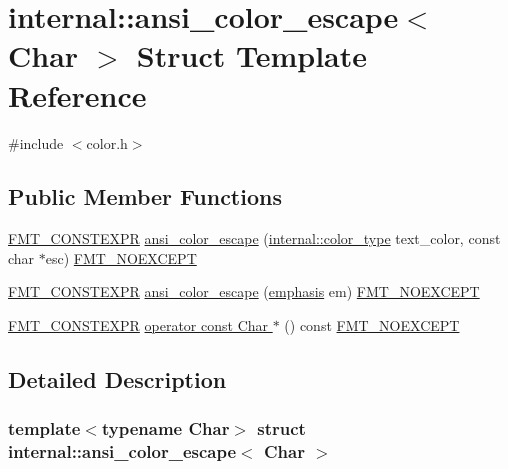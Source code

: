 \hypertarget{structinternal_1_1ansi__color__escape}{}\section{internal\+:\+:ansi\+\_\+color\+\_\+escape$<$ Char $>$ Struct Template Reference}
\label{structinternal_1_1ansi__color__escape}


{\ttfamily \#include $<$color.\+h$>$}

\subsection*{Public Member Functions}
\begin{DoxyCompactItemize}
\item 
\hyperlink{core_8h_a69201cb276383873487bf68b4ef8b4cd}{F\+M\+T\+\_\+\+C\+O\+N\+S\+T\+E\+X\+PR} \hyperlink{structinternal_1_1ansi__color__escape_ae3bd35bc9fb7e4f6bcf14b01d863d608}{ansi\+\_\+color\+\_\+escape} (\hyperlink{structinternal_1_1color__type}{internal\+::color\+\_\+type} text\+\_\+color, const char $\ast$esc) \hyperlink{core_8h_aef128913e8400683b1cbd1a3a2e11df3}{F\+M\+T\+\_\+\+N\+O\+E\+X\+C\+E\+PT}
\item 
\hyperlink{core_8h_a69201cb276383873487bf68b4ef8b4cd}{F\+M\+T\+\_\+\+C\+O\+N\+S\+T\+E\+X\+PR} \hyperlink{structinternal_1_1ansi__color__escape_a3e6165e4bdf4e0b65fcba754c6fb4c49}{ansi\+\_\+color\+\_\+escape} (\hyperlink{color_8h_a535b59b8edc8902bb3c4f254625f91ba}{emphasis} em) \hyperlink{core_8h_aef128913e8400683b1cbd1a3a2e11df3}{F\+M\+T\+\_\+\+N\+O\+E\+X\+C\+E\+PT}
\item 
\hyperlink{core_8h_a69201cb276383873487bf68b4ef8b4cd}{F\+M\+T\+\_\+\+C\+O\+N\+S\+T\+E\+X\+PR} \hyperlink{structinternal_1_1ansi__color__escape_a7e81490080d70a2b39b9168d160a02b0}{operator const Char $\ast$} () const \hyperlink{core_8h_aef128913e8400683b1cbd1a3a2e11df3}{F\+M\+T\+\_\+\+N\+O\+E\+X\+C\+E\+PT}
\end{DoxyCompactItemize}


\subsection{Detailed Description}
\subsubsection*{template$<$typename Char$>$\newline
struct internal\+::ansi\+\_\+color\+\_\+escape$<$ Char $>$}



